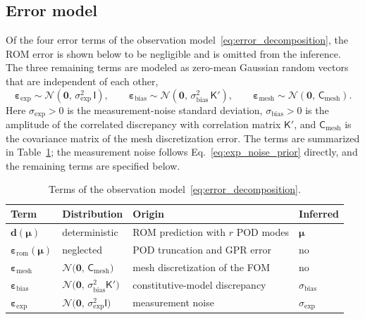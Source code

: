 \documentclass{elsarticle}
\renewcommand{\vec}[1]{\boldsymbol{#1}}
\newcommand{\mat}[1]{\mathsf{#1}}
\newcommand{\params}{\boldsymbol{\mu}}
\newcommand{\subexp}{\mathrm{exp}}
\newcommand{\subbias}{\mathrm{bias}}
\newcommand{\submesh}{\mathrm{mesh}}        %
\newcommand{\rom}{\mathrm{rom}}
\begin{document}
\subsection{Error model}
\label{subsec:error_model}

Of the four error terms of the observation
model~\eqref{eq:error_decomposition}, the ROM error is shown below to be
negligible and is omitted from the inference. The three remaining terms are
modeled as zero-mean Gaussian random vectors that are independent of each other,
\begin{equation}
\vec{\varepsilon}_{\subexp}
\sim \mathcal{N}\!\left(\vec{0},\,\sigma_{\subexp}^{2}\,\mat{I}\right),
\qquad
\vec{\varepsilon}_{\subbias}
\sim \mathcal{N}\!\left(\vec{0},\,\sigma_{\subbias}^{2}\,\mat{K}'\right),
\qquad
\vec{\varepsilon}_{\submesh}
\sim \mathcal{N}\!\left(\vec{0},\,\mat{C}_{\submesh}\right).
\label{eq:exp_noise_prior}
\end{equation}
Here $\sigma_{\subexp}>0$ is the measurement-noise standard deviation,
$\sigma_{\subbias}>0$ is the amplitude of the correlated discrepancy with
correlation matrix $\mat{K}'$, and $\mat{C}_{\submesh}$ is the covariance matrix
of the mesh discretization error. The terms are summarized in
Table~\ref{tab:error_terms}; the measurement noise follows
Eq.~\eqref{eq:exp_noise_prior} directly, and the remaining terms are specified
below.

\begin{table}[!ht]
\centering
\small
\begin{tabular}{llll}
\toprule
Term & Distribution & Origin & Inferred \\
\midrule
$\vec{d}(\params)$
  & deterministic
  & ROM prediction with $r$ POD modes
  & $\params$ \\
$\vec{\varepsilon}_{\rom}(\params)$
  & neglected
  & POD truncation and GPR error
  & no \\
$\vec{\varepsilon}_{\submesh}$
  & $\mathcal{N}\bigl(\vec{0},\,\mat{C}_{\submesh}\bigr)$
  & mesh discretization of the FOM
  & no \\
$\vec{\varepsilon}_{\subbias}$
  & $\mathcal{N}\bigl(\vec{0},\,\sigma_{\subbias}^{2}\mat{K}'\bigr)$
  & constitutive-model discrepancy
  & $\sigma_{\subbias}$ \\
$\vec{\varepsilon}_{\subexp}$
  & $\mathcal{N}\bigl(\vec{0},\,\sigma_{\subexp}^{2}\mat{I}\bigr)$
  & measurement noise
  & $\sigma_{\subexp}$ \\
\bottomrule
\end{tabular}
\caption{Terms of the observation model~\eqref{eq:error_decomposition}.}
\label{tab:error_terms}
\end{table}
\end{document}
